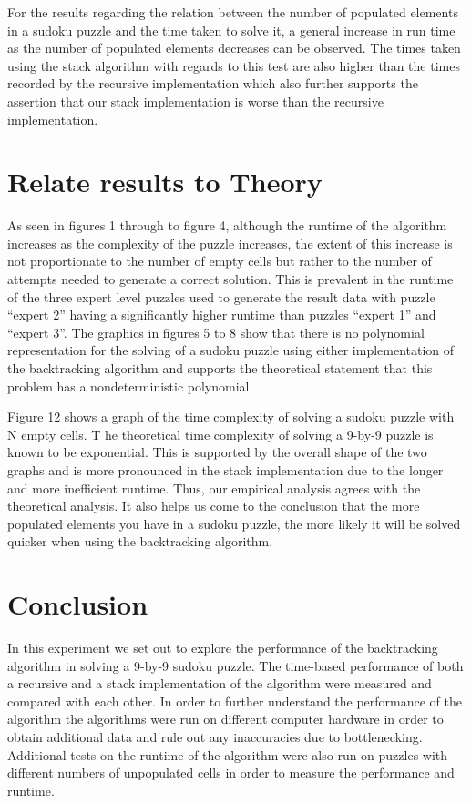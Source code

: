 \documentclass[11pt]{article}
\begin{document}
\vspace{3mm}

For the results regarding the relation between the number of populated elements in a sudoku puzzle and the time taken to solve it, 
a general increase in run time as the number of populated elements decreases can be observed. The times taken using the stack algorithm with regards to this test are also higher 
than the times recorded by the recursive implementation which also further supports the assertion that our stack implementation is worse than the recursive implementation.

\section{Relate results to Theory}
As seen in figures 1 through to figure 4, although the runtime of the algorithm increases as the complexity of the puzzle increases, 
the extent of this increase is not proportionate to the number of empty cells but rather to the number of attempts needed to generate a correct solution. 
This is prevalent in the runtime of the three expert level puzzles used to generate the result data with puzzle “expert 2” 
having a significantly higher runtime than puzzles “expert 1” and “expert 3”. The graphics in figures 5 to 8 show that there is no polynomial 
representation for the solving of a sudoku puzzle using either implementation of the backtracking algorithm and supports the theoretical statement that this problem has a 
nondeterministic polynomial.

\vspace{3mm}

Figure 12 shows a graph of the time complexity of solving a sudoku puzzle with N empty cells. T
he theoretical time complexity of solving a 9-by-9 puzzle is known to be exponential. This is supported by the overall shape of the two graphs and is more pronounced in 
the stack implementation due to the longer and more inefficient runtime. Thus, our empirical analysis agrees with the theoretical analysis. It also helps us come to the 
conclusion that the more populated elements you have in a sudoku puzzle, the more likely it will be solved quicker when using the backtracking algorithm.

\section{Conclusion}
In this experiment we set out to explore the performance of the backtracking algorithm in solving a 9-by-9 sudoku puzzle. The time-based performance of both a recursive and 
a stack implementation of the algorithm were measured and compared with each other. In order to further understand the performance of the algorithm the algorithms were run on 
different computer hardware in order to obtain additional data and rule out any inaccuracies due to bottlenecking. 
Additional tests on the runtime of the algorithm were also run on puzzles with different numbers of unpopulated cells in order to measure the performance and runtime. 
\end{document}
